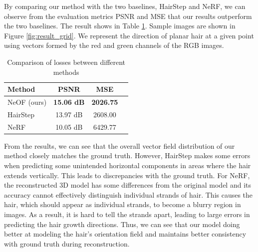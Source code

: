 \documentclass{article}
\begin{document}
By comparing our method with the two baselines, HairStep and NeRF, we can observe from the evaluation metrics PSNR and MSE that our results outperform the two baselines. The result shows in Table \ref{tab:loss_comparison}. Sample images are shown in Figure \ref{fig:result_grid}. We represent the direction of planar hair at a given point using vectors formed by the red and green channels of the RGB images.

\begin{table}[h]
\centering
\begin{tabular}{lccc}
\toprule
\textbf{Method} & \textbf{PSNR} & \textbf{MSE} \\ 
\midrule
NeOF (ours) & \textbf{15.06 dB} & \textbf{2026.75} \\
HairStep & 13.97 dB & 2608.00 \\
NeRF & 10.05 dB & 6429.77 \\
\bottomrule
\end{tabular}
\caption{Comparison of losses between different methods}
\label{tab:loss_comparison}
\end{table}

From the results, we can see that the overall vector field distribution of our method closely matches the ground truth. However, HairStep makes some errors when predicting some unintended horizontal components in areas where the hair extends vertically. This leads to discrepancies with the ground truth. For NeRF, the reconstructed 3D model has some differences from the original model and its accuracy cannot effectively distinguish individual strands of hair. This causes the hair, which should appear as individual strands, to become a blurry region in images. As a result, it is hard to tell the strands apart, leading to large errors in predicting the hair growth directions. Thus, we can see that our model doing better at modeling the hair's orientation field and maintains better consistency with ground truth during reconstruction.
\end{document}
